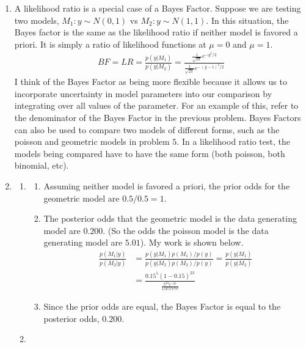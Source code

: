 \documentclass[12pt]{article}\usepackage[]{graphicx}\usepackage[]{color}
\begin{document}
\begin{doublespacing}
\begin{enumerate}
\item A likelihood ratio is a special case of a Bayes Factor. Suppose we are testing two models, $M_1: y \sim N(0,1)$ vs $M_2: y \sim N(1,1)$. In this situation, the Bayes factor is the same as the likelihood ratio if neither model is favored a priori. It is simply a ratio of likelihood functions at $\mu = 0$ and $\mu = 1$.
\begin{align*}
BF = LR = \frac{p(y|M_1)}{p(y|M_2)} = \frac{\frac{1}{\sqrt{2\pi}}e^{-y^2/2}}{\frac{1}{\sqrt{2\pi}}e^{-(y-1)^2/2}} 
\end{align*}
I think of the Bayes Factor as being more flexible because it allows us to incorporate uncertainty in model parameters into our comparison by integrating over all values of the parameter. For an example of this, refer to the denominator of the Bayes Factor in the previous problem. Bayes Factors can also be used to compare two models of different forms, such as the poisson and geometric models in problem $5$. In a likelihood ratio test, the models being compared have to have the same form (both poisson, both binomial, etc).


\item \begin{enumerate}

\item \begin{enumerate}

\item Assuming neither model is favored a priori, the prior odds for the geometric model are $0.5/0.5 = 1$.

\item The posterior odds that the geometric model is the data generating model are $0.200$. (So the odds the poisson model is the data generating model are $5.01$). My work is shown below. 
\begin{align*}
\frac{p(M_1|y)}{p(M_2|y)} &= \frac{p(y|M_1)p(M_1)/p(y)}{p(y|M_2)p(M_2)/p(y)} = \frac{p(y|M_1)}{p(y|M_2)} \\
&= \frac{0.15^5(1-0.15)^{23}}{\frac{5^{23} e^{-25}}{1!3!5!7!7!}}
\end{align*}



\item Since the prior odds are equal, the Bayes Factor is equal to the posterior odds, $0.200$.

\end{enumerate}

\item \begin{enumerate}


\end{enumerate}
\end{enumerate}
\end{enumerate}
\end{doublespacing}
\end{document}
